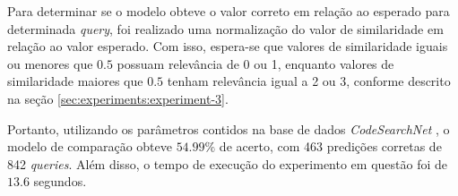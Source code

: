 Para determinar se o modelo obteve o valor correto em relação ao esperado para determinada \textit{query}, foi realizado uma normalização do valor de similaridade em relação ao valor esperado. Com isso, espera-se que valores de similaridade iguais ou menores que $0.5$ possuam relevância de 0 ou 1, enquanto valores de similaridade maiores que $0.5$ tenham relevância igual a 2 ou 3, conforme descrito na seção \ref{sec:experiments:experiment-3}.

Portanto, utilizando os parâmetros contidos na base de dados \textit{CodeSearchNet} \cite{Husain2019CodeSearchNetCE}, o modelo de comparação obteve $54.99\%$ de acerto, com 463 predições corretas de 842 \textit{queries}. Além disso, o tempo de execução do experimento em questão foi de $13.6$ segundos.


